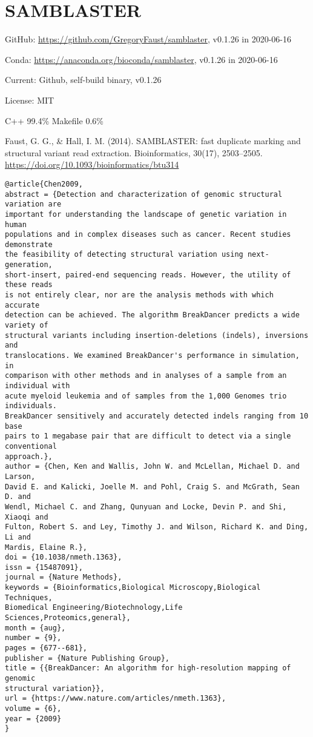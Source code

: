 \documentclass[]{article}
\begin{document}
\section{SAMBLASTER}

GitHub: \url{https://github.com/GregoryFaust/samblaster}, v0.1.26 in 2020-06-16

Conda: \url{https://anaconda.org/bioconda/samblaster}, v0.1.26 in 2020-06-16

Current: Github, self-build binary, v0.1.26

License: MIT

C++ 99.4\% Makefile 0.6\%

Faust, G. G., \& Hall, I. M. (2014). SAMBLASTER: fast duplicate marking and structural variant read extraction. Bioinformatics, 30(17), 2503–2505. \url{https://doi.org/10.1093/bioinformatics/btu314}

\begin{verbatim}
@article{Chen2009,
abstract = {Detection and characterization of genomic structural variation are
important for understanding the landscape of genetic variation in human
populations and in complex diseases such as cancer. Recent studies demonstrate
the feasibility of detecting structural variation using next-generation,
short-insert, paired-end sequencing reads. However, the utility of these reads
is not entirely clear, nor are the analysis methods with which accurate
detection can be achieved. The algorithm BreakDancer predicts a wide variety of
structural variants including insertion-deletions (indels), inversions and
translocations. We examined BreakDancer's performance in simulation, in
comparison with other methods and in analyses of a sample from an individual with
acute myeloid leukemia and of samples from the 1,000 Genomes trio individuals.
BreakDancer sensitively and accurately detected indels ranging from 10 base
pairs to 1 megabase pair that are difficult to detect via a single conventional
approach.},
author = {Chen, Ken and Wallis, John W. and McLellan, Michael D. and Larson,
David E. and Kalicki, Joelle M. and Pohl, Craig S. and McGrath, Sean D. and
Wendl, Michael C. and Zhang, Qunyuan and Locke, Devin P. and Shi, Xiaoqi and
Fulton, Robert S. and Ley, Timothy J. and Wilson, Richard K. and Ding, Li and
Mardis, Elaine R.},
doi = {10.1038/nmeth.1363},
issn = {15487091},
journal = {Nature Methods},
keywords = {Bioinformatics,Biological Microscopy,Biological Techniques,
Biomedical Engineering/Biotechnology,Life Sciences,Proteomics,general},
month = {aug},
number = {9},
pages = {677--681},
publisher = {Nature Publishing Group},
title = {{BreakDancer: An algorithm for high-resolution mapping of genomic
structural variation}},
url = {https://www.nature.com/articles/nmeth.1363},
volume = {6},
year = {2009}
}
\end{verbatim}
\end{document}
